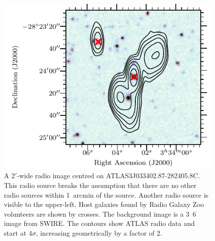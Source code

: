     \begin{figure}
      \centering
      \includegraphics[width=\linewidth]{atlas-images/CI0077C1_fig.pdf}
      \caption[A radio source breaking our assumption that there are no other radio sources with 1~arcmin of the source.]{A $2'$-wide radio image centred on ATLAS3\textunderscore{}J033402.87-282405.8C.
        This radio source breaks the assumption that there are no other radio
        sources within 1~arcmin of the source. Another radio source is visible
        to the upper-left. Host galaxies found by Radio Galaxy Zoo volunteers
        are shown by crosses. {The background image
        is a \unit{3.6}{\micro\meter} image from SWIRE. The contours show ATLAS radio data and start at $4\sigma$, increasing geometrically by a factor of 2.}}
      \label{fig:broken-isolation}
    \end{figure}

